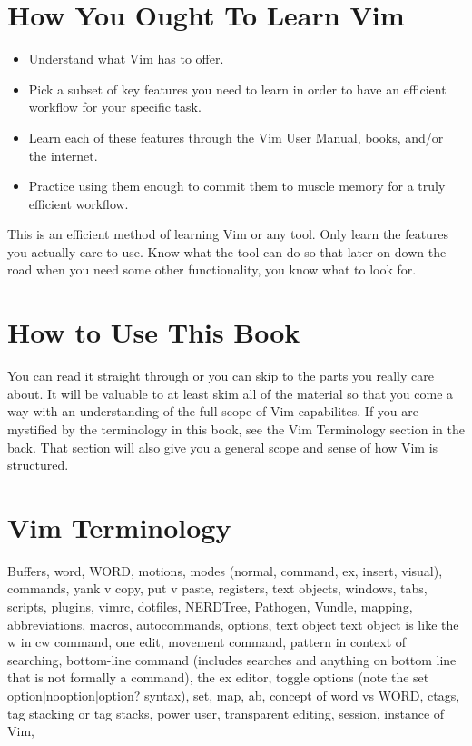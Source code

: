 \documentclass[12pt]{book}
\begin{document}
\section{How You Ought To Learn Vim}
\begin{itemize}
\item Understand what Vim has to offer.
\item Pick a subset of key features you need to learn in order to have an efficient workflow for your specific task.
\item Learn each of these features through the Vim User Manual, books, and/or the internet.
\item Practice using them enough to commit them to muscle memory for a truly efficient workflow. 
\end{itemize}
This is an efficient method of learning Vim or any tool. 
Only learn the features you actually care to use. 
Know what the tool can do so that later on down the road when you need some other functionality, you know what to look for.

\section{How to Use This Book}
You can read it straight through or you can skip to the parts you really care about.  
It will be valuable to at least skim all of the material so that you come a way with an understanding of the full scope of Vim capabilites.
If you are mystified by the terminology in this book, see the Vim Terminology section in the back.
That section will also give you a general scope and sense of how Vim is structured.

\section{Vim Terminology}
Buffers, word, WORD, motions, modes (normal, command, ex, insert, visual), commands, yank v copy, put v paste, registers, text objects, windows, tabs, scripts, plugins, vimrc, dotfiles,
NERDTree, Pathogen, Vundle, mapping, abbreviations, macros, autocommands, options, text object text object is like the w in cw command, one edit, movement command, pattern in context of 
searching, bottom-line command (includes searches and anything on bottom line that is not formally a command), the ex editor, toggle options (note the set option|nooption|option? syntax), 
set, map, ab, concept of word vs WORD, ctags, tag stacking or tag stacks, power user, transparent editing, session, instance of Vim, 
\end{document}
